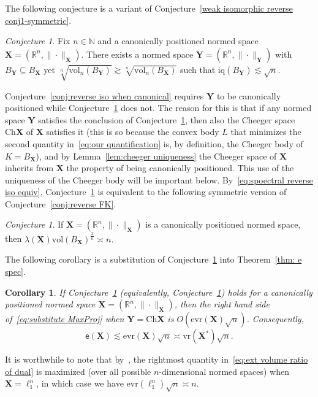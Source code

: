 \documentclass[11pt,reqno]{amsart}
\newcommand{\vr}{\mathrm{vr}}
\newcommand{\evr}{\mathrm{evr}}
\newcommand{\X}{\mathbf X}
\newcommand{\Y}{\mathbf Y}
\newcommand{\R}{\mathbb R}
\newtheorem{corollary}[theorem]{Corollary}
\theoremstyle{remark}
\newtheorem{conjecture}[theorem]{Conjecture}
\newcommand{\iq}{\mathrm{iq}}
\renewcommand{\subset}{\subseteq}
\newcommand{\N}{\mathbb N}
\newcommand{\Ch}{\mathrm{Ch}}
\newcommand{\ee}{\mathsf{e}}
\newcommand{\vol}{\mathrm{vol}}
\renewcommand{\1}{\mathbf 1}
\begin{document}
The following conjecture is a variant of Conjecture~\ref{weak isomorphic reverse conj1-symmetric}.
\begin{conjecture}\label{conj:weak reverse iso when canonical} Fix $n\in \N$ and a canonically positioned normed space $\X=(\R^n,\|\cdot\|_\X)$. There exists a normed space $\Y=(\R^n,\|\cdot\|_\Y)$ with $B_\Y \subset B_\X$ yet $\sqrt[n]{\vol_n(B_\Y)}\gtrsim \sqrt[n]{\vol_n(B_\X)}$ such that $\iq(B_\Y)\lesssim \sqrt{n}$.
\end{conjecture}
Conjecture~\ref{conj:reverse iso when canonical} requires  $\Y$ to be canonically positioned while   Conjecture~\ref{conj:weak reverse iso when canonical} does not. The reason for this is that if any normed space $\Y$ satisfies the conclusion of Conjecture~\ref{conj:weak reverse iso when canonical}, then also the Cheeger space $\Ch \X$ of $\X$ satisfies it (this is so because the convex body $L$ that minimizes  the second quantity in~\eqref{eq:our quantification} is, by definition, the Cheeger body of $K=B_\X$), and by Lemma~\ref{lem:cheeger uniqueness} the Cheeger space of $\X$ inherits from $\X$ the property of being canonically positioned. This use of the uniqueness of the Cheeger body will be important below. By~\eqref{eq:spoectral reverse iso equiv}, Conjecture~\ref{conj:weak reverse iso when canonical} is equivalent to the following symmetric version of Conjecture~\ref{conj:reverse FK}.
\begin{conjecture}\label{conj:sym reverse FK} If $\X=(\R^n,\|\cdot\|_\X)$ is  a canonically positioned normed space, then
$
 \lambda(\X)\vol(B_\X)^{\frac{2}{n}}\asymp n.
$
\end{conjecture}





The following corollary is a substitution of Conjecture~\ref{conj:sym reverse FK}  into Theorem~\ref{thm: e spec}.

\begin{corollary}\label{cor:if weak reverse holds} If Conjecture~\ref{conj:weak reverse iso when canonical}  (equivalently, Conjecture~\ref{conj:sym reverse FK}) holds for a canonically positioned normed space $\X=(\R^n,\|\cdot\|_\X)$, then the right hand side of~\eqref{eq:substitute MaxProj} when $\Y=\Ch \X$ is  $O(\evr(\X)\sqrt{n})$. Consequently, \begin{equation}\label{eq:ext volume ratio of dual}
\ee(\X)\lesssim \evr(\X)\sqrt{n}\asymp \vr(\X^*)\sqrt{n}.\end{equation}
\end{corollary}
It is worthwhile to note that by~\cite{Bal89}, the rightmost quantity in~\eqref{eq:ext volume ratio of dual} is maximized (over all possible $n$-dimensional normed spaces) when  $\X=\ell_1^n$, in which case we have $\evr(\ell_1^n)\sqrt{n}\asymp n$.
\end{document}
